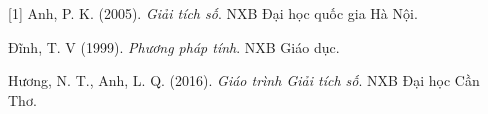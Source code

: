 [1] Anh, P. K. (2005). \textit{Giải tích số}. NXB Đại học quốc gia Hà Nội.\par
[2] Đĩnh, T. V (1999). \textit{Phương pháp tính}. NXB Giáo dục.\par
[3] Hương, N. T., Anh, L. Q. (2016). \textit{Giáo trình Giải tích số}. NXB Đại học Cần Thơ.\par

